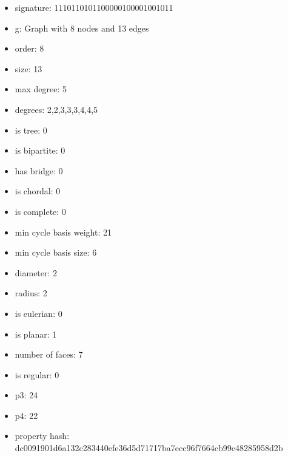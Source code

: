 \begin{itemize}
\item signature: 1110110101100000100001001011
\item g: Graph with 8 nodes and 13 edges
\item order: 8
\item size: 13
\item max degree: 5
\item degrees: 2,2,3,3,3,4,4,5
\item is tree: 0
\item is bipartite: 0
\item has bridge: 0
\item is chordal: 0
\item is complete: 0
\item min cycle basis weight: 21
\item min cycle basis size: 6
\item diameter: 2
\item radius: 2
\item is eulerian: 0
\item is planar: 1
\item number of faces: 7
\item is regular: 0
\item p3: 24
\item p4: 22
\item property hash: dc0091901d6a132c283440efe36d5d71717ba7ecc96f7664cb99c48285958d2b
\end{itemize}
\newpage
\begin{figure}
\end{figure}
